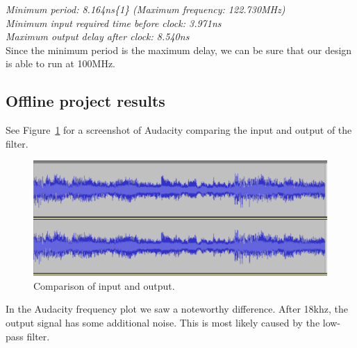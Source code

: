 \documentclass[a4paper,twoside,11pt, fleqn]{article}
\begin{document}
\textit{Minimum period:   8.164ns\{1\}   (Maximum frequency: 122.730MHz)\\
   Minimum input required time before clock:   3.971ns\\
   Maximum output delay after clock:   8.540ns}\\

Since the minimum period is the maximum delay, we can be sure that our design is able to run at 100MHz.

\newpage
\subsection{Offline project results}
\label{sec:4results}

See Figure~\ref{fig:compInOut} for a screenshot of Audacity comparing the input and output of the filter.

\begin{figure}[h]
	\includegraphics[scale = 0.76]{Images/offline_run_results.png}
    \caption{Comparison of input and output.}
    \label{fig:compInOut}
\end{figure}

In the Audacity frequency plot we saw a noteworthy difference. After 18khz, the output signal has some additional noise. This is most likely caused by the low-pass filter.
\end{document}
